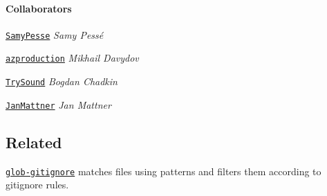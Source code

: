 \paragraph*{Collaborators}


\begin{DoxyItemize}
\item \href{https://github.com/SamyPesse}{\tt Samy\+Pesse} {\itshape Samy Pessé}
\item \href{https://github.com/azproduction}{\tt azproduction} {\itshape Mikhail Davydov}
\item \href{https://github.com/TrySound}{\tt Try\+Sound} {\itshape Bogdan Chadkin}
\item \href{https://github.com/JanMattner}{\tt Jan\+Mattner} {\itshape Jan Mattner}
\end{DoxyItemize}

\subsection*{Related}


\begin{DoxyItemize}
\item \href{https://www.npmjs.com/package/glob-gitignore}{\tt {\ttfamily glob-\/gitignore}} matches files using patterns and filters them according to gitignore rules. 
\end{DoxyItemize}